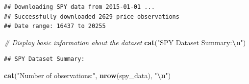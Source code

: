 \documentclass[
]{article}
\newenvironment{Shaded}{\begin{snugshade}}{\end{snugshade}}
\newcommand{\AttributeTok}[1]{\textcolor[rgb]{0.13,0.29,0.53}{#1}}
\newcommand{\CommentTok}[1]{\textcolor[rgb]{0.56,0.35,0.01}{\textit{#1}}}
\newcommand{\ControlFlowTok}[1]{\textcolor[rgb]{0.13,0.29,0.53}{\textbf{#1}}}
\newcommand{\FunctionTok}[1]{\textcolor[rgb]{0.13,0.29,0.53}{\textbf{#1}}}
\newcommand{\NormalTok}[1]{#1}
\newcommand{\OtherTok}[1]{\textcolor[rgb]{0.56,0.35,0.01}{#1}}
\newcommand{\SpecialCharTok}[1]{\textcolor[rgb]{0.81,0.36,0.00}{\textbf{#1}}}
\newcommand{\StringTok}[1]{\textcolor[rgb]{0.31,0.60,0.02}{#1}}
\begin{document}
\begin{Shaded}
\end{Shaded}

\begin{verbatim}
## Downloading SPY data from 2015-01-01 ...
## Successfully downloaded 2629 price observations
## Date range: 16437 to 20255
\end{verbatim}

\begin{Shaded}
\begin{Highlighting}[]
\CommentTok{\# Display basic information about the dataset}
\FunctionTok{cat}\NormalTok{(}\StringTok{"SPY Dataset Summary:}\SpecialCharTok{\textbackslash{}n}\StringTok{"}\NormalTok{)}
\end{Highlighting}
\end{Shaded}

\begin{verbatim}
## SPY Dataset Summary:
\end{verbatim}

\begin{Shaded}
\begin{Highlighting}[]
\FunctionTok{cat}\NormalTok{(}\StringTok{"Number of observations:"}\NormalTok{, }\FunctionTok{nrow}\NormalTok{(spy\_data), }\StringTok{"}\SpecialCharTok{\textbackslash{}n}\StringTok{"}\NormalTok{)}
\end{Highlighting}
\end{Shaded}
\end{document}
